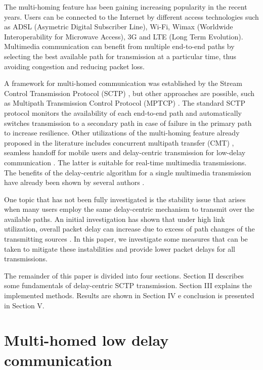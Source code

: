 \documentclass[letterpaper,10pt,oneside,conference,final]{sbrt2015}
\begin{document}
  The multi-homing feature has been gaining increasing popularity in the recent years. Users can be connected to the Internet by different access technologies such as ADSL (Asymetric Digital Subscriber Line), Wi-Fi, Wimax (Worldwide Interoperability for Microwave Access), 3G and LTE (Long Term Evolution). Multimedia communication can benefit from multiple end-to-end paths by selecting the best available path for transmission at a particular time, thus avoiding congestion and reducing packet loss.

A framework for multi-homed communication was established by the Stream Control Transmission Protocol (SCTP) \cite{Stewart2007a}, but other approaches are possible, such as Multipath Transmission Control Protocol (MPTCP) \cite{Ford2013}\cite{Zekri2012}. The standard SCTP protocol monitors the availability of each end-to-end path and automatically switches transmission to a secondary path in case of failure in the primary path to increase resilience. Other utilizations of the multi-homing feature already proposed in the literature includes concurrent multipath transfer (CMT) \cite{Casetti2004}\cite{Ye2004}\cite{Iyengar2006}, seamless handoff for mobile users \cite{Koh2004}\cite{Ma2004} and delay-centric transmission for low-delay communication \cite{Kelly2004}\cite{Kashihara2004}. The latter is suitable for real-time multimedia transmissions.
The benefits of the delay-centric algorithm for a single multimedia transmission have already been shown by several authors \cite{Noonan2004b}\cite{Fitzpatrick2007}\cite{Gavriloff2009a}\cite{Runcos2010}. 

One topic that has not been fully investigated is the stability issue that arises when many users employ the same delay-centric mechanism to transmit over the available paths. An initial investigation has shown that under high link utilization, overall packet delay can increase due to excess of path changes of the transmitting sources \cite{Gavriloff2009}.
In this paper, we investigate some measures that can be taken to mitigate these instabilities and provide lower packet delays for all transmissions.

The remainder of this paper is divided into four sections. Section II describes some fundamentals of delay-centric SCTP transmission. Section III explains the implemented methods. Results are shown in Section IV e conclusion is presented in Section V.  

  \section{Multi-homed low delay communication}
  
\end{document}
